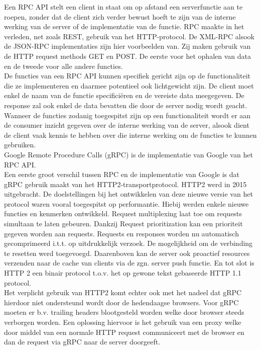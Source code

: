 Een RPC API stelt een client in staat om op afstand een serverfunctie aan te roepen, zonder dat de client zich verder bewust hoeft te zijn van de interne werking
van de server of de implementatie van de functie.
RPC maakte in het verleden, net zoals REST, gebruik van het HTTP-protocol. De XML-RPC alsook de JSON-RPC implementaties zijn hier voorbeelden van.
Zij maken gebruik van de HTTP request methods GET en POST. De eerste voor het ophalen van data en de tweede voor alle andere functies.\\

De functies van een RPC API kunnen specifiek gericht zijn op de functionaliteit die ze implementeren en daarmee potentieel ook lichtgewicht zijn.
De client moet enkel de naam van de functie specificiëren en de vereiste data meegegeven. De response zal ook enkel de data bevatten die door de server nodig wordt geacht.
Wanneer de functies zodanig toegespitst zijn op een functionaliteit wordt er aan de consumer inzicht gegeven over de interne werking van de server,
alsook dient de client vaak kennis te hebben over die interne werking om de functies te kunnen gebruiken.
~\autocite{altexsoft}\\

Google Remote Procedure Calls (gRPC) is de implementatie van Google van het RPC API.\\
Een eerste groot verschil tussen RPC en de implementatie van Google is dat gRPC gebruik maakt van het HTTP2-transportprotocol.
HTTP2 werd in 2015 uitgebracht. De doelstellingen bij het ontwikkelen van deze nieuwe versie van het protocol waren vooral toegespitst op performantie.
Hiebij werden enkele nieuwe functies en kenmerken ontwikkeld. Request multiplexing laat toe om requests simultaan te laten gebeuren.
Dankzij Request prioritization kan een prioriteit gegeven worden aan requests. Requests en responses worden nu automatisch gecomprimeerd i.t.t. op
uitdrukkelijk verzoek. De mogelijkheid om de verbinding te resetten werd toegevoegd. Daarenboven kan de server ook proactief resources verzenden naar de
cache van clients via de zgn. server push functie. En tot slot is HTTP 2 een binair protocol t.o.v. het op gewone tekst gebaseerde HTTP 1.1 protocol.
~\autocite{baeldung}\\

Het verplicht gebruik van HTTP2 komt echter ook met het nadeel dat gRPC hierdoor niet ondersteund wordt door de hedendaagse browsers.
Voor gRPC moeten er b.v. trailing headers blootgesteld worden welke door browser steeds verborgen worden. Een oplossing hiervoor is het gebruik van een proxy welke
door middel van een normale HTTP request communiceert met de browser en dan de request via gRPC naar de server doorgeeft.
~\autocite{altexsoftgrpc}\\
~\autocite{yukutakahashi}\\

